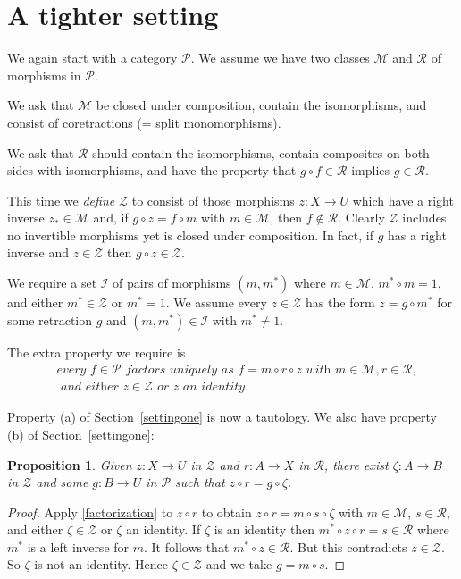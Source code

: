 \documentclass[a4paper,12pt,reqno]{amsart}
\newtheorem{proposition}[theorem]{Proposition}
\theoremstyle{definition}
\theoremstyle{fact}
\theoremstyle{genquest}
\theoremstyle{step}
\newcommand{\ra}{\rightarrow}
\def\CI{{\mathscr I}}
\def\CM{{\mathscr M}}
\def\CP{{\mathscr P}}
\def\CR{{\mathscr R}}
\def\CZ{{\mathscr Z}}
\begin{document}
\section{A tighter setting}\label{settingtwo}

We again start with a category $\CP$.
We assume we have two classes $\CM$ and $\CR$ of morphisms in $\CP$. 

We ask that $\CM$ be closed under composition, contain the isomorphisms,
and consist of coretractions (= split monomorphisms). 

We ask that $\CR$ should contain the isomorphisms, contain composites
on both sides with isomorphisms, and have the property that 
$g\circ f \in \CR$ implies $g\in \CR$.

This time we {\em define} $\CZ$ to consist of those morphisms $z : X \rightarrow U$
which have a right inverse $z_* \in \CM$ and, if $g \circ z = f\circ m$ with 
$m\in \CM$, then $f \notin \CR$.
Clearly $\CZ$ includes no invertible morphisms yet is closed under composition.
In fact, if $g$ has a right inverse and $z\in \CZ$ then $g \circ z\in \CZ$. 

We require a set $\CI$ of pairs of morphisms $(m,m^*)$ where $m\in \CM$,
$m^*\circ m = 1$, and either $m^*\in\CZ$ or $m^*=1$. 
We assume every $z\in \CZ$ has the form $z = g\circ m^*$ for some 
retraction $g$ and $(m,m^*)\in \CI$ with $m^*\neq 1$.

The extra property we require is
\begin{align}\label{factorization}
& \textit{every } f\in \CP \textit{ factors uniquely as } f=m\circ r \circ z \textit{ with }
m\in \CM, r\in \CR, \nonumber \\ 
& \textit{ and either } z\in \CZ \textit{ or } z \textit{ an identity.} 
\end{align}

Property (a) of Section~\ref{settingone} is now a tautology.
We also have property (b) of Section~\ref{settingone}:
\begin{proposition}
Given $z : X \ra U$ in $\CZ$ and $r : A \ra X$ in $\CR$, there exist
$\zeta : A \ra B$ in $\CZ$ and some $g:B\ra U$ in $\CP$ such that 
$z\circ r = g\circ \zeta$. 
\end{proposition}
\begin{proof}
Apply \eqref{factorization} to $z\circ r$ to obtain $z\circ r = m\circ s \circ \zeta$
with $m\in \CM$, $s\in \CR$, and either $\zeta \in \CZ$ or $\zeta$ an identity.
If $\zeta$ is an identity then 
$m^*\circ z\circ r = s \in \CR$ where $m^*$ is a left inverse for $m$. 
It follows that $m^*\circ z \in \CR$. But this contradicts $z\in \CZ$. So
$\zeta$ is not an identity. Hence $\zeta \in \CZ$ and we take $g = m\circ s$.  
\end{proof} 
\end{document}
